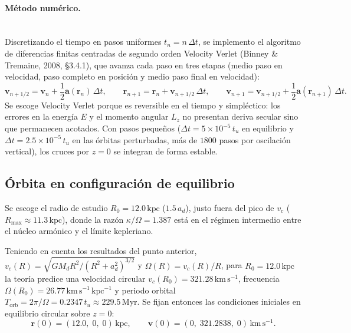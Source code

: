 \documentclass[11pt,letterpaper]{article}
\begin{document}
\paragraph{Método numérico.}
\mbox{}\\[0.4em]
Discretizando el tiempo en pasos uniformes $t_n = n\,\Delta t$, se implemento el algoritmo de diferencias finitas centradas de segundo orden Velocity Verlet (Binney \& Tremaine, 2008, \S 3.4.1), que avanza cada paso en tres etapas (medio paso en velocidad, paso completo en posición y medio paso final en velocidad):
\begin{equation}
    \mathbf{v}_{n+1/2} = \mathbf{v}_n + \frac{1}{2}\mathbf{a}(\mathbf{r}_n)\,\Delta t, \qquad
    \mathbf{r}_{n+1} = \mathbf{r}_n + \mathbf{v}_{n+1/2}\,\Delta t, \qquad
    \mathbf{v}_{n+1} = \mathbf{v}_{n+1/2} + \frac{1}{2}\mathbf{a}(\mathbf{r}_{n+1})\,\Delta t.
\end{equation}
Se escoge Velocity Verlet porque es reversible en el tiempo y simpléctico: los errores en la energía $E$ y el momento angular $L_z$ no presentan deriva secular sino que permanecen acotados. Con pasos pequeños ($\Delta t = 5\times 10^{-5}\,t_u$ en equilibrio y $\Delta t = 2.5\times 10^{-5}\,t_u$ en las órbitas perturbadas, más de $1800$ pasos por oscilación vertical), los cruces por $z = 0$ se integran de forma estable.

\subsection{Órbita en configuración de equilibrio}

Se escoge el radio de estudio $R_0 = 12.0\,\mathrm{kpc}$ ($1.5\,a_d$), justo fuera del pico de $v_c$ ($R_{\mathrm{max}} \approx 11.3\,\mathrm{kpc}$), donde la razón $\kappa/\Omega = 1.387$ está en el régimen intermedio entre el núcleo armónico y el límite kepleriano.

Teniendo en cuenta los resultados del punto anterior, $v_c(R) = \sqrt{GM_d R^2/(R^2 + a_d^2)^{3/2}}$ y $\Omega(R) = v_c(R)/R$, para $R_0 = 12.0\,\mathrm{kpc}$ la teoría predice una velocidad circular $v_c(R_0) = 321.28\,\mathrm{km\,s^{-1}}$, frecuencia $\Omega(R_0) = 26.77\,\mathrm{km\,s^{-1}\,kpc^{-1}}$ y periodo orbital $T_{\mathrm{orb}} = 2\pi/\Omega = 0.2347\,t_u \approx 229.5\,\mathrm{Myr}$. Se fijan entonces las condiciones iniciales en equilibrio circular sobre $z = 0$:
\begin{equation}
    \mathbf{r}(0) = (12.0,\; 0,\; 0)\,\mathrm{kpc}, \qquad
    \mathbf{v}(0) = (0,\; 321.2838,\; 0)\,\mathrm{km\,s^{-1}}.
\end{equation}
\end{document}
